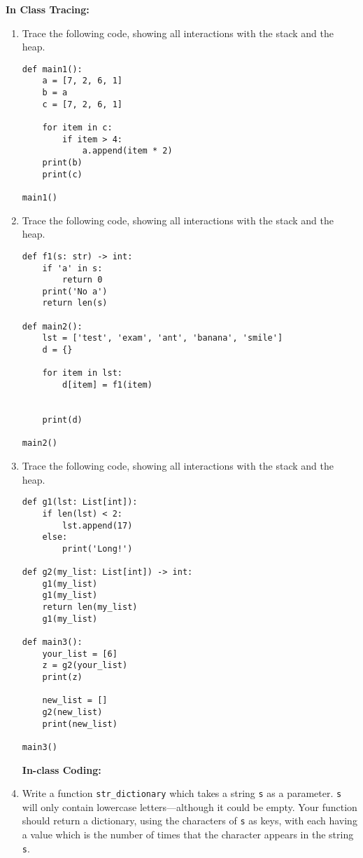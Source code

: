 \documentclass{article}
\begin{document}
\textbf{In Class Tracing:}
\begin{enumerate}


\item Trace the following code, showing all interactions with the stack and the heap.


\begin{verbatim}
def main1():
    a = [7, 2, 6, 1]
    b = a
    c = [7, 2, 6, 1]

    for item in c:
        if item > 4:
            a.append(item * 2)
    print(b)
    print(c)

main1()
\end{verbatim}

\item  Trace the following code, showing all interactions with the stack and the heap.

\begin{verbatim}
def f1(s: str) -> int:
    if 'a' in s:
        return 0
    print('No a')
    return len(s)

def main2():
    lst = ['test', 'exam', 'ant', 'banana', 'smile']
    d = {}

    for item in lst:
        d[item] = f1(item)


    print(d)

main2()
\end{verbatim}

\newpage
\item  Trace the following code, showing all interactions with the stack and the heap.

\begin{verbatim}
def g1(lst: List[int]):
    if len(lst) < 2:
        lst.append(17)
    else:
        print('Long!')

def g2(my_list: List[int]) -> int:
    g1(my_list)
    g1(my_list)
    return len(my_list)
    g1(my_list)

def main3():
    your_list = [6]
    z = g2(your_list)
    print(z)

    new_list = []
    g2(new_list)
    print(new_list)

main3()
\end{verbatim}

\textbf{In-class Coding:}
\item Write a function \verb|str_dictionary| which takes a string
  \verb|s| as a parameter.  \verb|s| will only contain lowercase
  letters---although it could be empty. Your function should return a
  dictionary, using the characters of \verb|s| as keys, with each
  having a value which is the number of times that the character
  appears in the string \verb|s|.


\end{enumerate}
\end{document}
